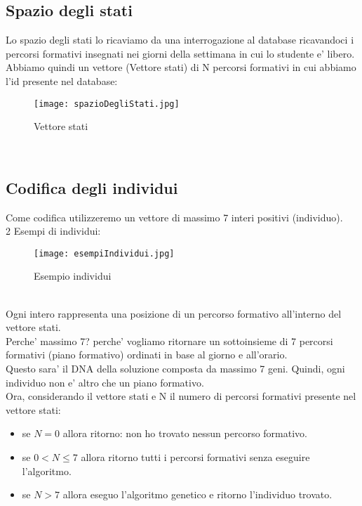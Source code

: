 \documentclass[10pt,a4paper]{article}
\begin{document}
    \subsection{Spazio degli stati}
      \label{spazioDegliStatiSubsection}
      Lo spazio degli stati lo ricaviamo da una interrogazione al database ricavandoci i percorsi formativi
      insegnati nei giorni della settimana in cui lo studente e' libero.\\
      Abbiamo quindi un vettore (Vettore stati) di N percorsi formativi in cui abbiamo l'id presente nel database:\\
      \begin{figure}[h!]
        \centering
        \caption{Vettore stati}
        \texttt{[image: spazioDegliStati.jpg]}
        \label{vettoreStati}
      \end{figure}\\
      
    \subsection{Codifica degli individui}
      \label{codificaDegliIndividuiSubsection}
      Come codifica utilizzeremo un vettore di massimo 7 interi positivi (individuo).\\
      2 Esempi di individui:\\
      \begin{figure}[h!]
        \centering
        \caption{Esempio individui}
        \texttt{[image: esempiIndividui.jpg]}
        \label{esempioIndividui}
      \end{figure}\\
      Ogni intero rappresenta una posizione di un percorso formativo all'interno del vettore stati.\\
      Perche' massimo 7? perche' vogliamo ritornare un sottoinsieme di 7 percorsi formativi (piano formativo)
      ordinati in base al giorno e all'orario.\\
      Questo sara' il DNA della soluzione composta da massimo 7 geni. Quindi, ogni individuo non e' 
      altro che un piano formativo.\\
      Ora, considerando il vettore stati e N il numero di percorsi formativi presente nel vettore stati:\\
      \begin{itemize}
        \item se $ N = 0 $ allora ritorno: non ho trovato nessun percorso formativo.
        \item se $ 0 < N \leq 7 $ allora ritorno tutti i percorsi formativi senza eseguire l'algoritmo.
        \item se $ N > 7 $ allora eseguo l'algoritmo genetico e ritorno l'individuo trovato.
      \end{itemize}
      
\end{document}
